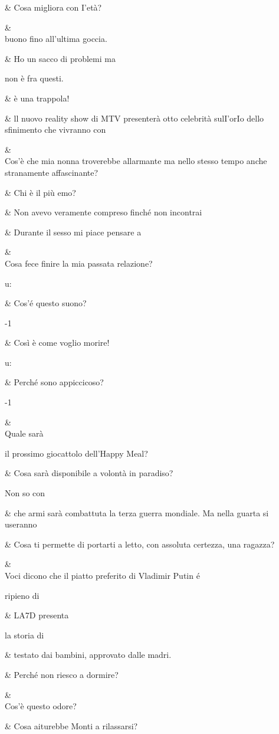 &
Cosa migliora
con I’età?

&
\\
buono fino
all’ultima goccia.

&
Ho un sacco
di problemi ma

non è fra questi.

&
è una trappola!

&
ll nuovo reality
show di MTV
presenterà otto
celebrità sulI’orIo
dello sfinimento che
vivranno con

&
\\
Cos’è che mia
nonna troverebbe
allarmante ma
nello stesso tempo
anche stranamente
affascinante?

&
Chi è il più emo?

&
Non avevo
veramente
compreso
finché non
incontrai

&
Durante il sesso
mi piace pensare
a

&
\\
Cosa fece finire
la mia passata
relazione?

u:

&
Cos’é questo
suono?

-1

&
Così è come
voglio morire!

u:

&
Perché sono
appiccicoso?

-1

&
\\
Quale sarà

il prossimo
giocattolo
dell’Happy Meal?

&
Cosa sarà
disponibile
a volontà in
paradiso?

Non so con

&
che armi sarà
combattuta la terza
guerra mondiale.
Ma nella guarta si
useranno

&
Cosa ti permette
di portarti a letto,
con assoluta
certezza, una
ragazza?

&
\\
Voci dicono che
il piatto preferito
di Vladimir Putin
é

ripieno di

&
LA7D presenta

la storia di

&
testato dai
bambini,
approvato dalle
madri.

&
Perché non
riesco a dormire?

&
\\
Cos’è questo
odore?

&
Cosa aiturebbe
Monti a
rilassarsi?

